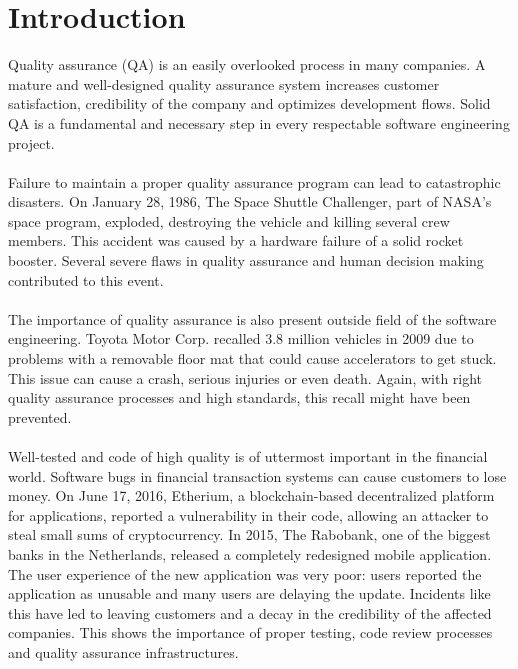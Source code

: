\chapter{Introduction}


Quality assurance (QA) is an easily overlooked process in many companies. A mature and well-designed quality assurance system increases customer satisfaction, credibility of the company and optimizes development flows. Solid QA is a fundamental and necessary step in every respectable software engineering project.\\\\
Failure to maintain a proper quality assurance program can lead to catastrophic disasters. On January 28, 1986, The Space Shuttle Challenger, part of NASA's space program, exploded, destroying the vehicle and killing several crew members. This accident was caused by a hardware failure of a solid rocket booster. Several severe flaws in quality assurance and human decision making contributed to this event.\\\\
The importance of quality assurance is also present outside field of the software engineering. Toyota Motor Corp. recalled 3.8 million vehicles in 2009 due to problems with a removable floor mat that could cause accelerators to get stuck. This issue can cause a crash, serious injuries or even death. Again, with right quality assurance processes and high standards, this recall might have been prevented.\\\\
Well-tested and code of high quality is of uttermost important in the financial world. Software bugs in financial transaction systems can cause customers to lose money.
On June 17, 2016, Etherium, a blockchain-based decentralized platform for applications, reported a vulnerability in their code, allowing an attacker to steal small sums of cryptocurrency. In 2015, The Rabobank, one of the biggest banks in the Netherlands, released a completely redesigned mobile application. The user experience of the new application was very poor: users reported the application as unusable and many users are delaying the update. Incidents like this have led to leaving customers and a decay in the credibility of the affected companies. This shows the importance of proper testing, code review processes and quality assurance infrastructures.\\\\

